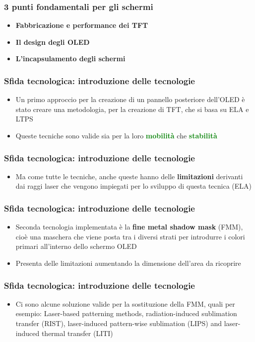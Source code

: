 \documentclass[12pt]{beamer}
\begin{document}
	\begin{frame}
		\frametitle{3 punti fondamentali per gli schermi}
		\begin{itemize}
			\item \textbf{Fabbricazione e performance dei TFT}
			\pause
			\item \textbf{Il design degli OLED} 
			\pause
			\item \textbf{L'incapsulamento degli schermi}
		\end{itemize}
	\end{frame}
	\begin{frame}
		\frametitle{Sfida tecnologica: introduzione delle tecnologie}
		\begin{itemize}
			\item Un primo approccio per la creazione di un pannello posteriore dell'OLED è stato creare una metodologia, per la creazione di TFT, che si basa su ELA e LTPS
			\pause
			\item Queste tecniche sono valide sia per la loro \textbf{\textcolor{green}{mobilità}} che \textbf{\textcolor{green}{stabilità}} 
		\end{itemize}
	\end{frame}
	\begin{frame}
		\frametitle{Sfida tecnologica: introduzione delle tecnologie}
		\begin{itemize}
			\item Ma come tutte le tecniche, anche queste hanno delle \textbf{limitazioni} derivanti dai raggi laser che vengono impiegati per lo sviluppo di questa tecnica (ELA)
		\end{itemize}
	\end{frame}
	\begin{frame}
		\frametitle{Sfida tecnologica: introduzione delle tecnologie}
		\begin{itemize}
			\item Seconda tecnologia implementata è la \textbf{fine metal shadow mask} (FMM), cioè una maschera che viene posta tra i diversi strati per introdurre i colori primari all'interno dello schermo OLED
			\pause
			\item Presenta delle limitazioni aumentando la dimensione dell'area da ricoprire
		\end{itemize}
	\end{frame}
	\begin{frame}
		\frametitle{Sfida tecnologica: introduzione delle tecnologie}
		\begin{itemize}
			\item Ci sono alcune soluzione valide per la sostituzione della FMM, quali per esempio: Laser-based patterning methods, radiation-induced sublimation transfer (RIST), laser-induced pattern-wise sublimation (LIPS) and laser-induced thermal transfer (LITI)
		\end{itemize}
	\end{frame}
\end{document}
